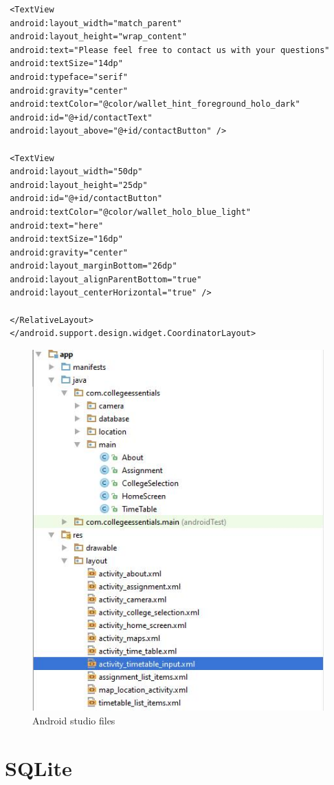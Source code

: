 \begin{verbatim}
 <TextView
 android:layout_width="match_parent"
 android:layout_height="wrap_content"
 android:text="Please feel free to contact us with your questions"
 android:textSize="14dp"
 android:typeface="serif"
 android:gravity="center"
 android:textColor="@color/wallet_hint_foreground_holo_dark"
 android:id="@+id/contactText"
 android:layout_above="@+id/contactButton" />
 
 <TextView
 android:layout_width="50dp"
 android:layout_height="25dp"
 android:id="@+id/contactButton"
 android:textColor="@color/wallet_holo_blue_light"
 android:text="here"
 android:textSize="16dp"
 android:gravity="center"
 android:layout_marginBottom="26dp"
 android:layout_alignParentBottom="true"
 android:layout_centerHorizontal="true" />
 
 </RelativeLayout>
 </android.support.design.widget.CoordinatorLayout>
 \end{verbatim}
 
 \begin{figure}
 	\caption{Android studio files}
 	\includegraphics{img/screenshot.jpg}
 \end{figure}
 
\section{SQLite}

